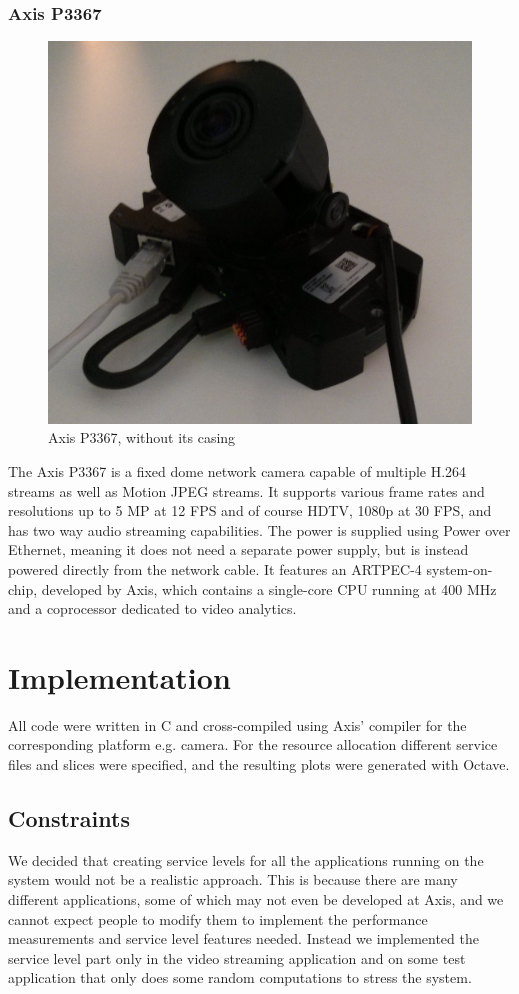 \documentclass{LTHthesis}
\begin{document}
\subsection{Axis P3367}
\begin{figure}
    \centering
    \includegraphics[width=\textwidth]{p3367}
    \caption{Axis P3367, without its casing}
    \label{fig:P3367}
\end{figure}
The Axis P3367 is a fixed dome network camera capable of multiple H.264 streams as well as Motion JPEG streams. It supports various frame rates and resolutions up to 5 MP at 12 FPS and of course HDTV, 1080p at 30 FPS, and has two way audio streaming capabilities. The power is supplied using Power over Ethernet, meaning it does not need a separate power supply, but is instead powered directly from the network cable. It features an ARTPEC-4 system-on-chip, developed by Axis, which contains a single-core CPU running at 400 MHz and a coprocessor dedicated to video analytics.
\chapter{Implementation}
All code were written in C and cross-compiled using Axis' compiler for the corresponding platform e.g. camera. For the resource allocation different service files and slices were specified, and the resulting plots were generated with Octave.
\section{Constraints} %
We decided that creating service levels for all the applications running on the system would not be a realistic approach. This is because there are many different applications, some of which may not even be developed at Axis, and we cannot expect people to modify them to implement the performance measurements and service level features needed. Instead we implemented the service level part only in the video streaming application and on some test application that only does some random computations to stress the system.
\end{document}
